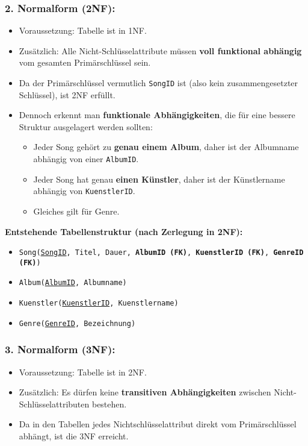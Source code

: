 \documentclass[a4paper,12pt]{article}
\begin{document}
\begin{enumerate}
		\subsubsection*{2. Normalform (2NF):}
		\begin{itemize}
			\item Voraussetzung: Tabelle ist in 1NF.
			\item Zusätzlich: Alle Nicht-Schlüsselattribute müssen \textbf{voll funktional abhängig} vom gesamten Primärschlüssel sein.
			\item Da der Primärschlüssel vermutlich \texttt{SongID} ist (also kein zusammengesetzter Schlüssel), ist 2NF erfüllt.
			\item Dennoch erkennt man \textbf{funktionale Abhängigkeiten}, die für eine bessere Struktur ausgelagert werden sollten:
			\begin{itemize}
				\item Jeder Song gehört zu \textbf{genau einem Album}, daher ist der Albumname abhängig von einer \texttt{AlbumID}.
				\item Jeder Song hat genau \textbf{einen Künstler}, daher ist der Künstlername abhängig von \texttt{KuenstlerID}.
				\item Gleiches gilt für Genre.
			\end{itemize}
		\end{itemize}
		
		\vspace{0.5em}
		
		\textbf{Entstehende Tabellenstruktur (nach Zerlegung in 2NF):}
		
		\begin{itemize}
			\item \texttt{Song(\underline{SongID}, Titel, Dauer, \textbf{AlbumID (FK)}, \textbf{KuenstlerID (FK)}, \textbf{GenreID (FK)})}
			\item \texttt{Album(\underline{AlbumID}, Albumname)}
			\item \texttt{Kuenstler(\underline{KuenstlerID}, Kuenstlername)}
			\item \texttt{Genre(\underline{GenreID}, Bezeichnung)}
		\end{itemize}
		
		\subsubsection*{3. Normalform (3NF):}
		\begin{itemize}
			\item Voraussetzung: Tabelle ist in 2NF.
			\item Zusätzlich: Es dürfen keine \textbf{transitiven Abhängigkeiten} zwischen Nicht-Schlüsselattributen bestehen.
			\item Da in den Tabellen jedes Nichtschlüsselattribut direkt vom Primärschlüssel abhängt, ist die 3NF erreicht.
		\end{itemize}
		

\end{enumerate}
\end{document}
